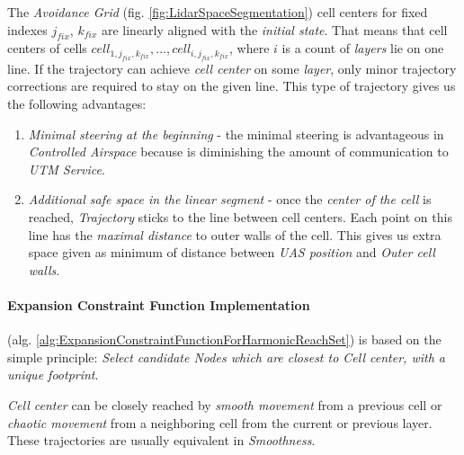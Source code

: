 The \emph{Avoidance Grid} (fig. \ref{fig:LidarSpaceSegmentation}) cell centers for fixed indexes $j_{fix}$, $k_{fix}$ are linearly aligned with the \emph{initial state}. That means that  cell centers of cells $cell_{1,j_{fix},k_{fix}},\dots, cell_{i,j_{fix},k_{fix}}$, where $i$ is a count of \emph{layers} lie on one line.  If the trajectory can achieve \emph{cell center} on some \emph{layer}, only minor trajectory corrections are required to stay on the given line. This type of trajectory gives us the  following advantages:
\begin{enumerate}
    \item\emph{Minimal steering at the beginning} - the minimal steering is advantageous in \emph{Controlled Airspace} because is diminishing the amount of communication to \emph{UTM Service}.
    
    \item\emph{Additional safe space in the linear segment} - once the \emph{center of the cell} is reached, \emph{Trajectory} sticks to the line between cell centers. Each point on this line has the \emph{maximal distance} to outer walls of the cell. This gives us extra space given as minimum of distance between \emph{UAS position} and \emph{Outer cell walls}.
\end{enumerate}

\paragraph{Expansion Constraint Function Implementation} (alg. \ref{alg:ExpansionConstraintFunctionForHarmonicReachSet}) is based on the simple principle: \emph{Select candidate Nodes  which are closest to Cell center, with a unique footprint}.

\begin{note}
    \emph{Cell center} can be closely reached by \emph{smooth movement} from a previous cell or \emph{chaotic movement} from a neighboring cell from the current or previous layer. These trajectories are usually equivalent in \emph{Smoothness}.
\end{note}


